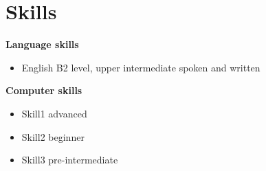 \documentclass[11pt]{article}
\begin{document}
\section*{Skills}
\noindent{\rule{\linewidth}{0.4pt}}
\textbf{Language skills}
\TabPositions{3cm}
\begin{itemize}
        \item English \tab B2 level, upper intermediate spoken and written
\end{itemize}
\textbf{Computer skills}
\begin{multicols}{2}
\begin{itemize}
        \item Skill1 \tab advanced
        \item Skill2 \tab beginner
        \item Skill3 \tab pre-intermediate
\end{itemize}
\end{multicols}
\end{document}
